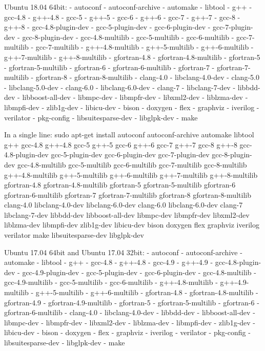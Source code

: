 \begin{DoxyVerbInclude}
Ubuntu 18.04 64bit:
- autoconf
- autoconf-archive
- automake
- libtool
- g++
- gcc-4.8
- g++-4.8
- gcc-5
- g++-5
- gcc-6
- g++-6
- gcc-7
- g++-7
- gcc-8
- g++-8
- gcc-4.8-plugin-dev
- gcc-5-plugin-dev
- gcc-6-plugin-dev
- gcc-7-plugin-dev
- gcc-8-plugin-dev
- gcc-4.8-multilib
- gcc-5-multilib
- gcc-6-multilib
- gcc-7-multilib
- gcc-7-multilib
- g++-4.8-multilib
- g++-5-multilib
- g++-6-multilib
- g++-7-multilib
- g++-8-multilib
- gfortran-4.8
- gfortran-4.8-multilib 
- gfortran-5
- gfortran-5-multilib
- gfortran-6 
- gfortran-6-multilib
- gfortran-7
- gfortran-7-multilib
- gfortran-8
- gfortran-8-multilib
- clang-4.0
- libclang-4.0-dev
- clang-5.0
- libclang-5.0-dev
- clang-6.0
- libclang-6.0-dev
- clang-7
- libclang-7-dev
- libbdd-dev
- libboost-all-dev
- libmpc-dev
- libmpfr-dev
- libxml2-dev
- liblzma-dev
- libmpfi-dev
- zlib1g-dev
- libicu-dev
- bison
- doxygen
- flex
- graphviz
- iverilog
- verilator
- pkg-config
- libsuitesparse-dev
- libglpk-dev
- make


In a single line:
sudo apt-get install autoconf autoconf-archive automake libtool g++ gcc-4.8 g++-4.8 gcc-5 g++-5 gcc-6 g++-6 gcc-7 g++-7 gcc-8 g++-8 gcc-4.8-plugin-dev gcc-5-plugin-dev gcc-6-plugin-dev gcc-7-plugin-dev  gcc-8-plugin-dev gcc-4.8-multilib gcc-5-multilib gcc-6-multilib gcc-7-multilib gcc-8-multilib g++-4.8-multilib g++-5-multilib g++-6-multilib g++-7-multilib g++-8-multilib gfortran-4.8 gfortran-4.8-multilib gfortran-5 gfortran-5-multilib gfortran-6 gfortran-6-multilib gfortran-7 gfortran-7-multilib gfortran-8 gfortran-8-multilib clang-4.0 libclang-4.0-dev libclang-6.0-dev clang-6.0 libclang-6.0-dev clang-7 libclang-7-dev libbdd-dev libboost-all-dev libmpc-dev libmpfr-dev libxml2-dev liblzma-dev libmpfi-dev zlib1g-dev libicu-dev bison doxygen flex graphviz iverilog verilator make libsuitesparse-dev libglpk-dev


Ubuntu 17.04 64bit and Ubuntu 17.04 32bit:
- autoconf
- autoconf-archive
- automake
- libtool
- g++
- gcc-4.8
- g++-4.8
- gcc-4.9
- g++-4.9
- gcc-4.8-plugin-dev
- gcc-4.9-plugin-dev
- gcc-5-plugin-dev
- gcc-6-plugin-dev
- gcc-4.8-multilib
- gcc-4.9-multilib
- gcc-5-multilib
- gcc-6-multilib
- g++-4.8-multilib
- g++-4.9-multilib
- g++-5-multilib
- g++-6-multilib
- gfortran-4.8
- gfortran-4.8-multilib 
- gfortran-4.9
- gfortran-4.9-multilib
- gfortran-5 
- gfortran-5-multilib
- gfortran-6 
- gfortran-6-multilib
- clang-4.0
- libclang-4.0-dev
- libbdd-dev
- libboost-all-dev
- libmpc-dev
- libmpfr-dev
- libxml2-dev
- liblzma-dev
- libmpfi-dev
- zlib1g-dev
- libicu-dev
- bison
- doxygen
- flex
- graphviz
- iverilog
- verilator
- pkg-config
- libsuitesparse-dev
- libglpk-dev
- make



\end{DoxyVerbInclude}

